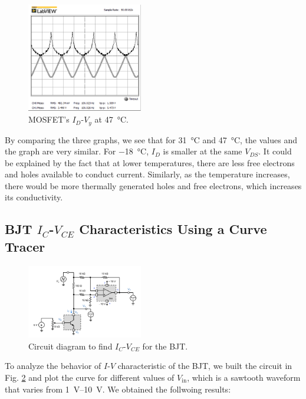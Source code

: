 \documentclass[journal]{IEEEtran}
\begin{document}
\begin{figure}[h]
  \centering
  \includegraphics[width=0.45\textwidth]{images/2-3.png}
  \caption{MOSFET’s $I_{D}$-$V_{y}$ at \SI{47}{\celsius}.}
  \label{fig-7}
\end{figure}
\par By comparing the three graphs, we see that for \SI{31}{\celsius} and
\SI{47}{\celsius}, the values and the graph are very similar. For
\SI{-18}{\celsius}, $I_{D}$ is smaller at the same $V_{DS}$. It could be
explained by the fact that at lower temperatures, there are less
free electrons and holes available to conduct current. Similarly,
as the temperature increases, there would be more thermally generated holes
and free electrons, which increases its conductivity.
\clearpage
\subsection{BJT $I_{C}$-$V_{CE}$ Characteristics Using a Curve Tracer}\label{sec-3}
\begin{figure}[h]
  \centering
  \includegraphics[width=0.45\textwidth]{images/3-1.png}
  \caption{Circuit diagram to find $I_{C}$-$V_{CE}$ for the BJT.}
  \label{fig-8}
\end{figure}
\par To analyze the behavior of $I$-$V$ characteristic of the BJT, we
built the circuit in Fig. \ref{fig-8} and plot the curve for different values
of $V_{\text{in}}$, which is a sawtooth waveform that varies from \SIrange{1}{10}{\volt}.
We obtained the follwoing results:
\end{document}
